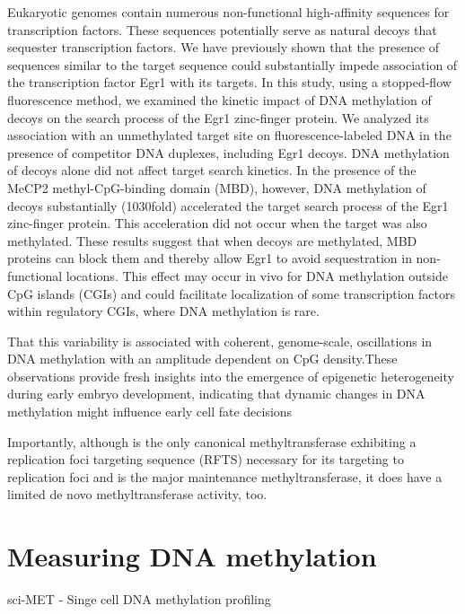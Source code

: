 Eukaryotic genomes contain numerous non-functional high-affinity sequences for transcription factors. These sequences potentially serve as natural decoys that sequester transcription factors. We have previously shown that the presence of sequences similar to the target sequence could substantially impede association of the transcription factor Egr1 with its targets. In this study, using a stopped-flow fluorescence method, we examined the kinetic impact of DNA methylation of decoys on the search process of the Egr1 zinc-finger protein. We analyzed its association with an unmethylated target site on fluorescence-labeled DNA in the presence of competitor DNA duplexes, including Egr1 decoys. DNA methylation of decoys alone did not affect target search kinetics. In the presence of the MeCP2 methyl-CpG-binding domain (MBD), however, DNA methylation of decoys substantially (1030fold) accelerated the target search process of the Egr1 zinc-finger protein. This acceleration did not occur when the target was also methylated. These results suggest that when decoys are methylated, MBD proteins can block them and thereby allow Egr1 to avoid sequestration in non-functional locations. This effect may occur in vivo for DNA methylation outside CpG islands (CGIs) and could facilitate localization of some transcription factors within regulatory CGIs, where DNA methylation is rare.\cite{Kemme2017}


That this variability is associated with coherent, genome-scale, oscillations in DNA methylation with an amplitude dependent on CpG density.These observations provide fresh insights into the emergence of epigenetic heterogeneity during early embryo development, indicating that dynamic changes in DNA methylation might influence early cell fate decisions\cite{Rulands2018}


Importantly, although  is the only canonical methyltransferase exhibiting a replication foci targeting sequence (RFTS) necessary for its targeting to replication foci and is the major maintenance methyltransferase, it does have a limited de novo methyltransferase activity, too\cite{Cai2017}.

\section{Measuring DNA methylation}

sci-MET - Singe cell DNA methylation profiling\cite{Mulqueen2018}


